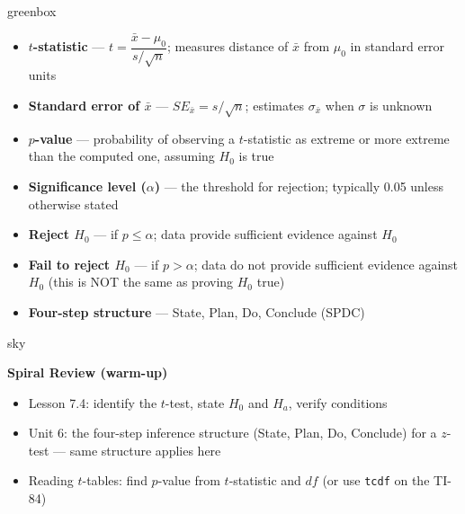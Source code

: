 \documentclass[10pt]{article}
\begin{document}
\begin{skillbox}{greenbox}
\begin{minipage}[t]{0.48\linewidth}
    \begin{itemize}
        \item \textbf{$t$-statistic} --- $t = \dfrac{\bar x - \mu_0}{s/\sqrt{n}}$; measures
              distance of $\bar x$ from $\mu_0$ in standard error units
        \item \textbf{Standard error of $\bar x$} --- $SE_{\bar x} = s/\sqrt{n}$; estimates
              $\sigma_{\bar x}$ when $\sigma$ is unknown
        \item \textbf{$p$-value} --- probability of observing a $t$-statistic as extreme or
              more extreme than the computed one, assuming $H_0$ is true
    \end{itemize}
\end{minipage}
\hfill
\begin{minipage}[t]{0.48\linewidth}
    \begin{itemize}
        \item \textbf{Significance level ($\alpha$)} --- the threshold for rejection; typically
              0.05 unless otherwise stated
        \item \textbf{Reject $H_0$} --- if $p \le \alpha$; data provide sufficient evidence
              against $H_0$
        \item \textbf{Fail to reject $H_0$} --- if $p > \alpha$; data do not provide sufficient
              evidence against $H_0$ (this is NOT the same as proving $H_0$ true)
        \item \textbf{Four-step structure} --- State, Plan, Do, Conclude (SPDC)
    \end{itemize}
\end{minipage}
\end{skillbox}

\begin{skillbox}{sky}
\begin{minipage}[t]{0.55\linewidth}\vspace{0pt}
    \textbf{Spiral Review (warm-up)}
    \begin{itemize}
        \item Lesson 7.4: identify the $t$-test, state $H_0$ and $H_a$, verify conditions
        \item Unit 6: the four-step inference structure (State, Plan, Do, Conclude) for a
              $z$-test --- same structure applies here
        \item Reading $t$-tables: find $p$-value from $t$-statistic and $df$ (or use
              \texttt{tcdf} on the TI-84)
    \end{itemize}
\end{minipage}
\hfill
\begin{minipage}[t]{0.38\linewidth}\vspace{0pt}\centering
\end{minipage}
\end{skillbox}
\end{document}
